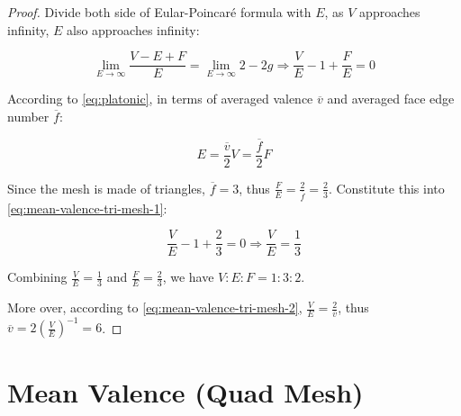 \begin{proof}
    Divide both side of Eular-Poincar\'e formula with $E$, as $V$ approaches infinity, $E$ also approaches infinity:

    \begin{equation}
        \lim_{E \to \infty} \frac{V - E + F}{E} = \lim_{E \to \infty} 2 - 2g
        \Rightarrow \frac{V}{E} - 1 + \frac{F}{E} = 0
        \label{eq:mean-valence-tri-mesh-1}
    \end{equation}

    According to \autoref{eq:platonic}, in terms of averaged valence $\overline{v}$ and averaged face edge number $\overline{f}$:

    \begin{equation}
        E = \frac{\overline{v}}{2} V = \frac{\overline{f}}{2} F
        \label{eq:mean-valence-tri-mesh-2}
    \end{equation}

    Since the mesh is made of triangles, $\overline{f} = 3$, thus $\frac{F}{E} = \frac{2}{\overline{f}} = \frac{2}{3}$. Constitute this into \autoref{eq:mean-valence-tri-mesh-1}:

    \begin{equation}
        \frac{V}{E} - 1 + \frac{2}{3} = 0
        \Rightarrow \frac{V}{E} = \frac{1}{3}
    \end{equation}

    Combining $\frac{V}{E} = \frac{1}{3}$ and $\frac{F}{E} = \frac{2}{3}$, we have $V:E:F = 1:3:2$.

    More over, according to \autoref{eq:mean-valence-tri-mesh-2}, $\frac{V}{E} = \frac{2}{\overline{v}}$, thus $\overline{v} = 2(\frac{V}{E})^{-1} = 6$.
\end{proof}

\section{Mean Valence (Quad Mesh)}
    
